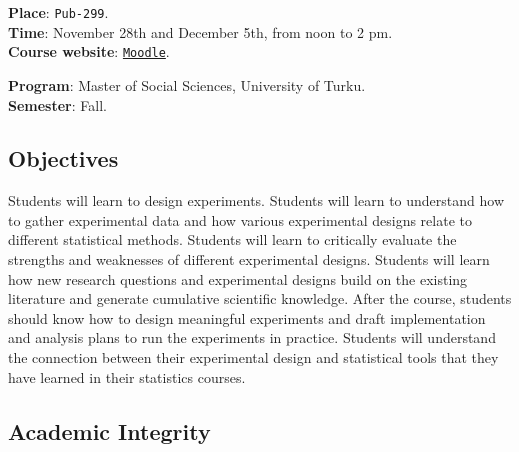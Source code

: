 \documentclass[letterpaper]{article}
\begin{document}
{\bf Place}: \texttt{Pub-299}.\\
{\bf Time}: November 28th and December 5th, from noon to 2 pm.\\

{\bf Course website}: \href{https://moodle.utu.fi/course/view.php?id=26195}{\texttt{Moodle}}.




\vspace{5mm}
{\bf Program}:  Master of Social Sciences, University of Turku.\\
{\bf Semester}: Fall.\\





\subsection*{Objectives}

Students will learn to design experiments. Students will learn to understand how to gather experimental data and how various experimental designs relate to different statistical methods. Students will learn to critically evaluate the strengths and weaknesses of different experimental designs. Students will learn how new research questions and experimental designs build on the existing literature and generate cumulative scientific knowledge. After the course, students should know how to design meaningful experiments and draft implementation and analysis plans to run the experiments in practice. Students will understand the connection between their experimental design and statistical tools that they have learned in their statistics courses.

\subsection*{Academic Integrity}
\end{document}
